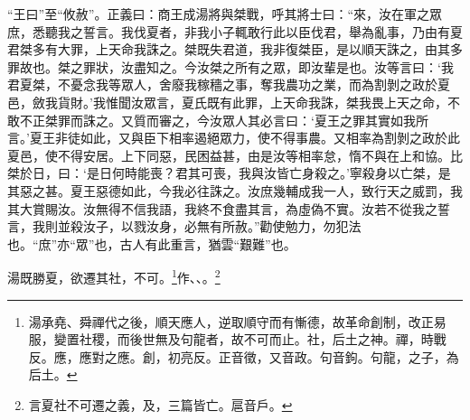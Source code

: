 {\noindent\shu{}\fzkt “王曰”至“攸赦”。正義曰：商王成湯將與桀戰，呼其將士曰：“來，汝在軍之眾庶，悉聽我之誓言。我伐夏者，非我小子輒敢行此以臣伐君，舉為亂事，乃由有夏君桀多有大罪，上天命我誅之。桀既失君道，我非復桀臣，是以順天誅之，由其多罪故也。桀之罪狀，汝盡知之。今汝桀之所有之眾，即汝輩是也。汝等言曰：‘我君夏桀，不憂念我等眾人，舍廢我稼穡之事，奪我農功之業，而為割剝之政於夏邑，斂我貨財。’我惟聞汝眾言，夏氏既有此罪，上天命我誅，桀我畏上天之命，不敢不正桀罪而誅之。又質而審之，今汝眾人其必言曰：‘夏王之罪其實如我所言。’夏王非徒如此，又與臣下相率遏絕眾力，使不得事農。又相率為割剝之政於此夏邑，使不得安居。上下同惡，民困益甚，由是汝等相率怠，惰不與在上和協。比桀於日，曰：‘是日何時能喪？君其可喪，我與汝皆亡身殺之。’寧殺身以亡桀，是其惡之甚。夏王惡德如此，今我必往誅之。汝庶幾輔成我一人，致行天之威罰，我其大賞賜汝。汝無得不信我語，我終不食盡其言，為虛偽不實。汝若不從我之誓言，我則並殺汝子，以戮汝身，必無有所赦。”勸使勉力，勿犯法也。“庶”亦“眾”也，古人有此重言，猶雲“艱難”也。 \par}

湯既勝夏，欲遷其社，不可。\footnote{湯承堯、舜禪代之後，順天應人，逆取順守而有慚德，故革命創制，改正易服，變置社稷，而後世無及句龍者，故不可而止。社，后土之神。禪，時戰反。應，應對之應。創，初亮反。正音徵，又音政。句音鉤。句龍，之子，為后土。}作、、。\footnote{言夏社不可遷之義，及，三篇皆亡。扈音戶。}

